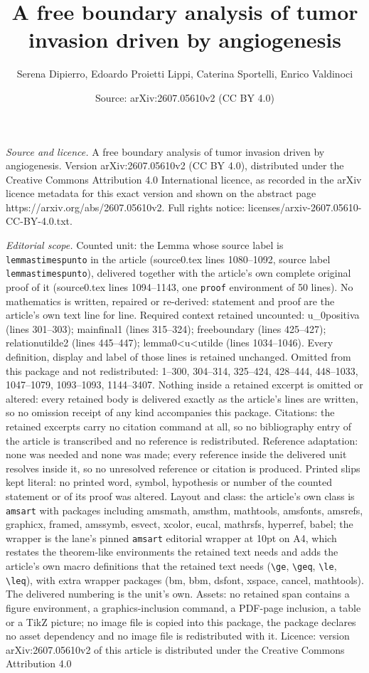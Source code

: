\documentclass[10pt,a4paper]{amsart}
\title[A free boundary analysis of tumor invasion driven by angioge]{A free boundary analysis of tumor invasion driven by angiogenesis}
\author{Serena Dipierro, Edoardo Proietti Lippi, Caterina Sportelli, Enrico Valdinoci}
\date{Source: arXiv:2607.05610v2 (CC BY 4.0)}
\begin{document}
\maketitle

\noindent\emph{Source and licence.} A free boundary analysis of tumor invasion driven by angiogenesis. Version arXiv:2607.05610v2 (CC BY 4.0), distributed under the Creative Commons Attribution 4.0 International licence, as recorded in the arXiv licence metadata for this exact version and shown on the abstract page https://arxiv.org/abs/2607.05610v2. Full rights notice: licenses/arxiv-2607.05610-CC-BY-4.0.txt.\par\smallskip

\noindent\textit{Editorial scope.} Counted unit: the Lemma whose source label is \texttt{lemmastimespunto} in the article (source0.tex lines 1080--1092, source label \texttt{lemmastimespunto}), delivered together with the article's own complete original proof of it (source0.tex lines 1094--1143, one \texttt{proof} environment of 50 lines). No mathematics is written, repaired or re-derived: statement and proof are the article's own text line for line. Required context retained uncounted: u\_0positiva (lines 301--303); mainfinal1 (lines 315--324); freeboundary (lines 425--427); relationutilde2 (lines 445--447); lemma0<u<utilde (lines 1034--1046). Every definition, display and label of those lines is retained unchanged. Omitted from this package and not redistributed: 1--300, 304--314, 325--424, 428--444, 448--1033, 1047--1079, 1093--1093, 1144--3407. Nothing inside a retained excerpt is omitted or altered: every retained body is delivered exactly as the article's lines are written, so no omission receipt of any kind accompanies this package. Citations: the retained excerpts carry no citation command at all, so no bibliography entry of the article is transcribed and no reference is redistributed. Reference adaptation: none was needed and none was made; every reference inside the delivered unit resolves inside it, so no unresolved reference or citation is produced. Printed slips kept literal: no printed word, symbol, hypothesis or number of the counted statement or of its proof was altered. Layout and class: the article's own class is \texttt{amsart} with packages including amsmath, amsthm, mathtools, amsfonts, amsrefs, graphicx, framed, amssymb, esvect, xcolor, eucal, mathrsfs, hyperref, babel; the wrapper is the lane's pinned \texttt{amsart} editorial wrapper at 10pt on A4, which restates the theorem-like environments the retained text needs and adds the article's own macro definitions that the retained text needs (\texttt{\textbackslash ge}, \texttt{\textbackslash geq}, \texttt{\textbackslash le}, \texttt{\textbackslash leq}), with extra wrapper packages (bm, bbm, dsfont, xspace, cancel, mathtools). The delivered numbering is the unit's own. Assets: no retained span contains a figure environment, a graphics-inclusion command, a PDF-page inclusion, a table or a TikZ picture; no image file is copied into this package, the package declares no asset dependency and no image file is redistributed with it. Licence: version arXiv:2607.05610v2 of this article is distributed under the Creative Commons Attribution 4.0 
\end{document}
